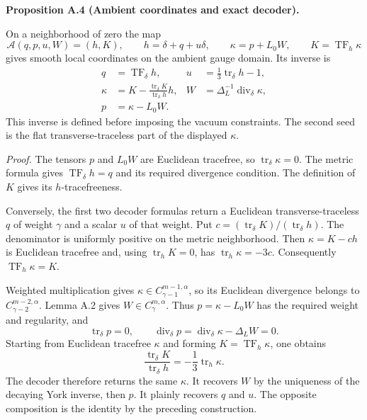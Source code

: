 \documentclass[
  english,
  11pt,
  reqno]{amsart}
\makeatletter
\newcommand{\pandocstatementheading}[1]{%
  \par\if@nobreak\else
    \addpenalty{\@beginparpenalty}%
    \addvspace{.5\baselineskip plus .2\baselineskip minus .2\baselineskip}%
  \fi
  {\normalfont\bfseries #1\par}%
  \nobreak\@afterindenttrue\@afterheading
}
\makeatother
\begin{document}
\pandocstatementheading{\leavevmode{}\label{prop:online-chart-exact-ambient-decoder}Proposition A.4 (Ambient coordinates and exact decoder).}

On a neighborhood of zero the map%
 \[
\mathcal A(q,p,u,W)=(h,K),\qquad
h=\delta+q+u\delta,\qquad
\kappa=p+L_0W,\qquad
K=\operatorname{TF}_h\kappa
\] gives smooth local coordinates on the ambient gauge domain. Its
inverse is%
 \[
\begin{aligned}
q&=\operatorname{TF}_\delta h,
&u&=\frac13\operatorname{tr}_\delta h-1,\\
\kappa&=K-\frac{\operatorname{tr}_\delta K}
{\operatorname{tr}_\delta h}h,
&W&=\Delta_L^{-1}\operatorname{div}_\delta\kappa,\\
p&=\kappa-L_0W.
\end{aligned}
\] This inverse is defined before imposing the vacuum constraints. The
second seed is the flat transverse-traceless part of the displayed
\(\kappa\).

\emph{Proof.} The tensors \(p\) and \(L_0W\) are Euclidean tracefree, so
\(\operatorname{tr}_\delta\kappa=0\). The metric formula gives
\(\operatorname{TF}_\delta h=q\) and its required divergence condition.
The definition of \(K\) gives its \(h\)-tracefreeness.

Conversely, the first two decoder formulas return a Euclidean
transverse-traceless \(q\) of weight \(\gamma\) and a scalar \(u\) of
that weight. Put
\(c=(\operatorname{tr}_\delta K)/(\operatorname{tr}_\delta h)\). The
denominator is uniformly positive on the metric neighborhood. Then
\(\kappa=K-ch\) is Euclidean tracefree and, using
\(\operatorname{tr}_hK=0\), has \(\operatorname{tr}_h\kappa=-3c\).
Consequently \(\operatorname{TF}_h\kappa=K\).

Weighted multiplication gives \(\kappa\in C^{m-1,\alpha}_{\gamma-1}\),
so its Euclidean divergence belongs to \(C^{m-2,\alpha}_{\gamma-2}\).
Lemma A.2 gives \(W\in C^{m,\alpha}_\gamma\). Thus \(p=\kappa-L_0W\) has
the required weight and regularity, and \[
\operatorname{tr}_\delta p=0,\qquad
\operatorname{div}_\delta p
=\operatorname{div}_\delta\kappa-\Delta_LW=0.
\] Starting from Euclidean tracefree \(\kappa\) and forming
\(K=\operatorname{TF}_h\kappa\), one obtains \[
\frac{\operatorname{tr}_\delta K}
{\operatorname{tr}_\delta h}
=-\frac13\operatorname{tr}_h\kappa.
\] The decoder therefore returns the same \(\kappa\). It recovers \(W\)
by the uniqueness of the decaying York inverse, then \(p\). It plainly
recovers \(q\) and \(u\). The opposite composition is the identity by
the preceding construction.
\end{document}
